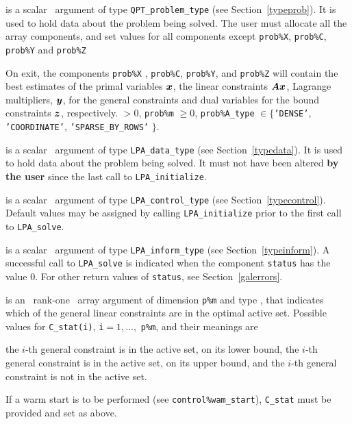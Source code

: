 \documentclass{galahad}
\newcommand{\packagename}{LPA}
\begin{document}
\begin{description}
 is a scalar \intentinout\ argument of type
{\tt QPT\_problem\_type}
(see Section~\ref{typeprob}).
It is used to hold data about the problem being solved.
The user must allocate all the array components,
and set values for all components except {\tt prob\%X}, {\tt prob\%C},
{\tt prob\%Y} and {\tt prob\%Z}

On exit, the components {\tt prob\%X} , {\tt prob\%C}, {\tt prob\%Y},
and {\tt prob\%Z}
will contain the best estimates of the primal variables ${\bm{x}}$,
the linear constraints ${\bm{A}} {\bm{x}}$,
Lagrange multipliers, ${\bm{y}}$, for the general constraints
and dual variables for the bound constraints ${\bm{z}}$, respectively.
 $> 0$, {\tt prob\%m} $\geq 0$,
 {\tt prob\%A\_type} $\in \{${\tt 'DENSE'},
 {\tt 'COORDINATE'}, {\tt 'SPARSE\_BY\_\-ROWS'} $\}$.

 is a scalar \intentinout\ argument of type
{\tt \packagename\_data\_type}
(see Section~\ref{typedata}). It is used to hold data about the problem being
solved. It must not have been altered {\bf by the user} since the last call to
{\tt \packagename\_initialize}.

 is a scalar \intentin\ argument of type
{\tt \packagename\_control\_type}
(see Section~\ref{typecontrol}). Default values may be assigned by calling
{\tt \packagename\_initialize} prior to the first call to
{\tt \packagename\_solve}.

 is a scalar \intentinout\ argument of type
{\tt \packagename\_inform\_type}
(see Section~\ref{typeinform}).
A successful call to
{\tt \packagename\_solve}
is indicated when the  component {\tt status} has the value 0.
For other return values of {\tt status}, see Section~\ref{galerrors}.

 is an \optional\ rank-one \intentout\ array argument of
dimension {\tt p\%m}
and type \integer, that indicates which of the general linear
constraints are in the optimal active set. Possible values for
{\tt C\_stat(i)}, {\tt i}$=1, \ldots ,$ {\tt p\%m}, and their meanings are
\begin{description}
 the $i$-th general constraint
is in the active set, on its lower bound,
 the $i$-th general constraint
is in the active set, on its upper bound, and
  the $i$-th general constraint is not in the active set.
\end{description}
If a warm start is to be performed (see {\tt control\%wam\_start}),
{\tt C\_stat} must be provided and set as above.


\end{description}
\end{document}
